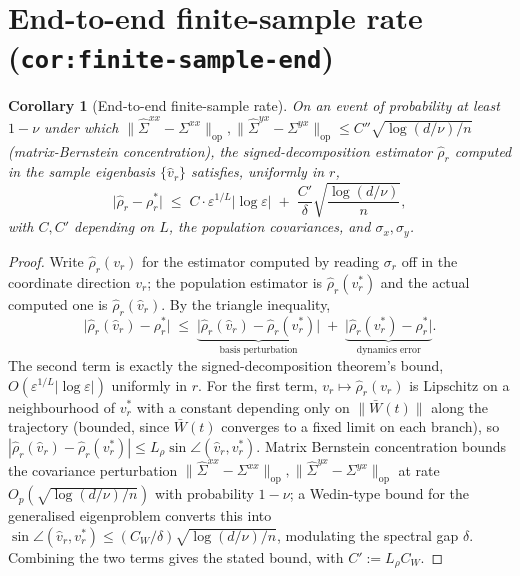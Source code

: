 \documentclass[11pt]{article}
\newcommand{\Wbar}{\bar{W}}
\newcommand{\Sxx}{\Sigma^{xx}}
\newcommand{\Syx}{\Sigma^{yx}}
\newcommand{\eps}{\varepsilon}
\newcommand{\rhostar}{\rho_r^*}
\newcommand{\sigmar}{\sigma_r}
\newcommand{\rhohat}{\hat{\rho}_r}
\theoremstyle{plain}
\newtheorem{corollary}[theorem]{Corollary}
\theoremstyle{definition}
\theoremstyle{remark}
\begin{document}
\section{End-to-end finite-sample rate (\texttt{cor:finite-sample-end})}
\label{sec:finite-sample-end}

\begin{corollary}[End-to-end finite-sample rate]
On an event of probability at least $1-\nu$ under which
$\|\hat\Sxx-\Sxx\|_{\mathrm{op}}, \|\hat\Syx-\Syx\|_{\mathrm{op}} \le
C''\sqrt{\log(d/\nu)/n}$ (matrix-Bernstein concentration), the signed-decomposition
estimator $\rhohat$ computed in the sample eigenbasis $\{\hat v_r\}$ satisfies,
uniformly in $r$,
\[
\big|\rhohat - \rhostar\big|
\;\le\;
C \cdot \eps^{1/L} |\log\eps|
\;+\;
\frac{C'}{\delta} \sqrt{\frac{\log(d/\nu)}{n}},
\]
with $C, C'$ depending on $L$, the population covariances, and $\sigma_x, \sigma_y$.
\end{corollary}

\begin{proof}
Write $\rhohat(v_r)$ for the estimator computed by reading $\sigmar$ off in the
coordinate direction $v_r$; the population estimator is $\rhohat(v_r^*)$ and the
actual computed one is $\rhohat(\hat v_r)$. By the triangle inequality,
\[
\big|\rhohat(\hat v_r) - \rhostar\big| \;\le\;
\underbrace{\big|\rhohat(\hat v_r) - \rhohat(v_r^*)\big|}_{\text{basis perturbation}}
\;+\;
\underbrace{\big|\rhohat(v_r^*) - \rhostar\big|}_{\text{dynamics error}}.
\]
The second term is exactly the signed-decomposition theorem's bound,
$O(\eps^{1/L}|\log\eps|)$ uniformly in $r$. For the first term,
$v_r \mapsto \rhohat(v_r)$ is Lipschitz on a neighbourhood of $v_r^*$ with a
constant depending only on $\|\Wbar(t)\|$ along the trajectory (bounded, since
$\Wbar(t)$ converges to a fixed limit on each branch), so
$|\rhohat(\hat v_r) - \rhohat(v_r^*)| \le L_\rho\sin\angle(\hat v_r, v_r^*)$. Matrix
Bernstein concentration \citep[Thm~1.6.2]{Tropp2015} bounds the covariance
perturbation $\|\hat\Sxx - \Sxx\|_{\mathrm{op}}, \|\hat\Syx - \Syx\|_{\mathrm{op}}$
at rate $O_p(\sqrt{\log(d/\nu)/n})$ with probability $1-\nu$; a Wedin-type bound for
the generalised eigenproblem converts this into
$\sin\angle(\hat v_r, v_r^*) \le (C_W/\delta)\sqrt{\log(d/\nu)/n}$, modulating the
spectral gap $\delta$. Combining the two terms gives the stated bound, with
$C' := L_\rho C_W$.
\end{proof}

\end{document}
